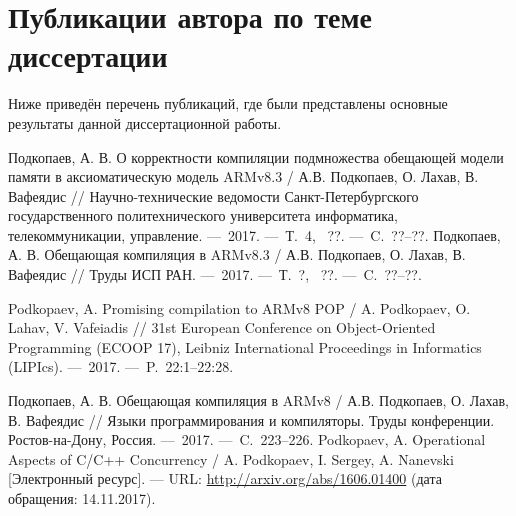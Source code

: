 
\section*{\LARGE Публикации автора по теме диссертации}

Ниже приведён перечень публикаций, где были представлены основные результаты данной  диссертационной работы. \\

\renewcommand{\bibsection}{\noindent \textbf{\refname}}

\renewcommand{\refname}{Статьи из \vakJournals}
\begin{thebibliography}{99}
 Подкопаев, А. В. О корректности компиляции подмножества обещающей модели памяти в аксиоматическую модель ARMv8.3 / А.В. Подкопаев, О. Лахав, В. Вафеядис // Научно-технические ведомости Санкт-Петербургского государственного политехнического университета информатика, телекоммуникации, управление. ---~2017. ---~Т.~4, \textnumero~??. ---~C.~??--??.
 Подкопаев, А. В. Обещающая компиляция в ARMv8.3 / А.В. Подкопаев, О. Лахав, В. Вафеядис // Труды ИСП РАН. ---~2017. ---~Т.~?, \textnumero~??. ---~C.~??--??.
\setcounter{firstbib}{\value{enumiv}}
\end{thebibliography}

\renewcommand{\refname}{Статьи в изданиях, входящих в базы цитирования Web of Science и SCOPUS}
\begin{thebibliography}{99}
\setcounter{enumiv}{\value{firstbib}}
 Podkopaev, A. Promising compilation to ARMv8 POP / A. Podkopaev, O. Lahav, V. Vafeiadis // 31st European Conference on Object-Oriented Programming (ECOOP 17), Leibniz International Proceedings in Informatics (LIPIcs).  ---~2017. ---~P.~22:1--22:28.
\setcounter{firstbib}{\value{enumiv}}
\end{thebibliography}

\renewcommand{\refname}{Статьи в других изданиях}
\begin{thebibliography}{99}
\setcounter{enumiv}{\value{firstbib}}
 Подкопаев, А. В. Обещающая компиляция в ARMv8 / А.В. Подкопаев, О. Лахав, В. Вафеядис // Языки программирования и компиляторы. Труды конференции. Ростов-на-Дону, Россия. ---~2017. ---~C.~223--226.
 Podkopaev, A. Operational Aspects of {C/C++} Concurrency / A. Podkopaev, I. Sergey, A. Nanevski
  [Электронный ресурс]. --- URL: \url{http://arxiv.org/abs/1606.01400} (дата обращения: 14.11.2017).
\end{thebibliography}
